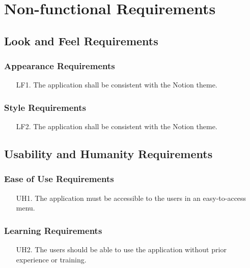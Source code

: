 \documentclass[12pt, titlepage]{article}
\begin{document}
\section{Non-functional Requirements}

\subsection{Look and Feel Requirements}

\subsubsection{Appearance Requirements}

\begin{itemize}
  \item[LF1.] The application shall be consistent with the Notion theme. 
\end{itemize}

\subsubsection{Style Requirements}

\begin{itemize}
  \item[LF2.] The application shall be consistent with the Notion theme. 
\end{itemize}

\subsection{Usability and Humanity Requirements}

\subsubsection{Ease of Use Requirements}

\begin{itemize}
  \item[UH1.] The application must be accessible to the users in an easy-to-access menu.
\end{itemize}

\subsubsection{ Learning Requirements}

\begin{itemize}
  \item[UH2.] The users should be able to use the application without prior experience or training.
\end{itemize}
\end{document}
